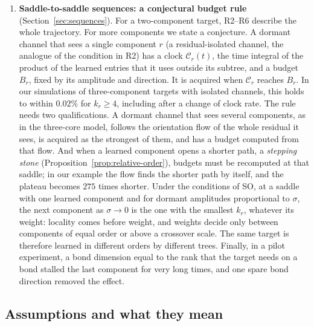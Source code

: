 \documentclass[11pt]{article}
\newcommand{\SO}{\textsf{SO}}
\newcommand{\Clk}{\mathcal{C}}
\theoremstyle{definition}
\numberwithin{equation}{section}
\begin{document}
\begin{enumerate}[label=\textbf{R\arabic*.},leftmargin=*,itemsep=3pt]
\item \textbf{Saddle-to-saddle sequences: a conjectural budget rule} (Section~\ref{sec:sequences}). For a two-component target, R2--R6 describe the whole trajectory. For more components we state a conjecture. A dormant channel that sees a single component $r$ (a residual-isolated channel, the analogue of the condition in R2) has a clock $\Clk_r(t)$, the time integral of the product of the learned entries that it uses outside its subtree, and a budget $B_r$, fixed by its amplitude and direction. It is acquired when $\Clk_r$ reaches $B_r$. In our simulations of three-component targets with isolated channels, this holds to within $0.02\%$ for $k_r\ge4$, including after a change of clock rate. The rule needs two qualifications. A dormant channel that sees several components, as in the three-core model, follows the orientation flow of the whole residual it sees, is acquired as the strongest of them, and has a budget computed from that flow. And when a learned component opens a shorter path, a \emph{stepping stone} (Proposition~\ref{prop:relative-order}), budgets must be recomputed at that saddle; in our example the flow finds the shorter path by itself, and the plateau becomes $275$ times shorter. Under the conditions of \SO, at a saddle with one learned component and for dormant amplitudes proportional to $\sigma$, the next component as $\sigma\to0$ is the one with the smallest $k_r$, whatever its weight: locality comes before weight, and weights decide only between components of equal order or above a crossover scale. The same target is therefore learned in different orders by different trees. Finally, in a pilot experiment, a bond dimension equal to the rank that the target needs on a bond stalled the last component for very long times, and one spare bond direction removed the effect.
\end{enumerate}

\subsection{Assumptions and what they mean}\label{sec:assumptions}
\end{document}
